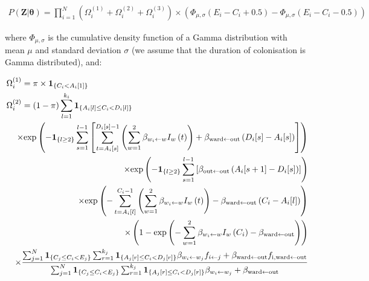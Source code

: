 \documentclass[10pt]{article}
\begin{document}
\begin{eqnarray*}
P\left(\bm{Z}|\bm{\theta}\right) = 
\bm{\prod}_{i=1}^N %
\left( \Omega_i^{\left(1\right)} + \Omega_i^{\left(2\right)} + \Omega_i^{\left(3\right)} \right) \times \left(\Phi_{\mu,\sigma}\left(E_i-C_i+0.5\right) - \Phi_{\mu,\sigma}\left(E_i-C_i-0.5\right) \right)
\end{eqnarray*}

\noindent where $\Phi_{\mu,\sigma}$ is the cumulative density function of a Gamma distribution with mean $\mu$ and standard deviation $\sigma$ (we assume that the duration of colonisation is Gamma distributed), and: 

\begin{eqnarray*}
\lefteqn{\Omega_i^{\left(1\right)} = \pi \times \mathbf{1}_{\left\lbrace C_i < A_i[1] \right\rbrace} }\\
\lefteqn{\Omega_i^{\left(2\right)}  = \left( 1-\pi \right) \sum_{l=1}^{k_i} \mathbf{1}_{\left\lbrace A_i[l] \leq C_i < D_i[l] \right\rbrace}}\\
	 && \times \text{exp}\left( - \mathbf{1}_{\left\lbrace l \geq 2 \right\rbrace} \sum_{s=1}^{l-1} \left[ \sum_{t=A_i[s]}^{D_i[s]-1} \left( \sum_{w=1}^{2} \beta_{w_i \leftarrow w} I_w\left(t\right) \right) + \beta_{\text{ward} \leftarrow \text{out}}\left(D_i[s]-A_i[s]\right) \right] \right) \\
	 && \times \text{exp}\left( - \mathbf{1}_{\left\lbrace l \geq 2 \right\rbrace} \sum_{s=1}^{l-1} \left[ \beta_{\text{out} \leftarrow \text{out}}\left(A_i[s+1]-D_i[s]\right) \right] \right) \\
	 && \times \text{exp}\left( - \sum_{t=A_i[l]}^{C_i-1} \left( \sum_{w=1}^{2} \beta_{w_i \leftarrow w} I_w\left(t\right) \right) - \beta_{\text{ward} \leftarrow \text{out}}\left(C_i-A_i[l]\right)  \right) \\
	 && \times \left( 1 - \text{exp}\left( - \sum_{w=1}^{2} \beta_{w_i \leftarrow w} I_w\left(C_i\right) - \beta_{\text{ward} \leftarrow \text{out}} \right) \right) \\
	 && \times \frac{\sum_{j=1}^N \mathbf{1}_{\left\lbrace C_j \leq C_i < E_j \right\rbrace} \sum_{r=1}^{k_j} \mathbf{1}_{\left\lbrace A_j[r] \leq C_i < D_j[r] \right\rbrace} \beta_{w_i \leftarrow w_j} f_{i \leftarrow j} + \beta_{\text{ward} \leftarrow \text{out}}f_{\text{i},\text{ward} \leftarrow \text{out}} }{\sum_{j=1}^N \mathbf{1}_{\left\lbrace C_j \leq C_i < E_j \right\rbrace} \sum_{r=1}^{k_j} \mathbf{1}_{\left\lbrace A_j[r] \leq C_i < D_j[r] \right\rbrace} \beta_{w_i \leftarrow w_j} + \beta_{\text{ward} \leftarrow \text{out}} } \\

\end{eqnarray*}
\end{document}
